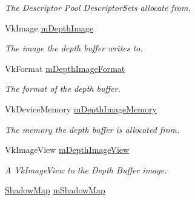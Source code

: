 \begin{DoxyCompactItemize}
\begin{DoxyCompactList}\small\item\em The Descriptor Pool Descriptor\+Sets allocate from. \end{DoxyCompactList}\item 
\mbox{\label{class_render_system_a57ca6a17b446f6aeb649f27b0a075c4c}} 
Vk\+Image \mbox{\hyperlink{class_render_system_a57ca6a17b446f6aeb649f27b0a075c4c}{m\+Depth\+Image}}
\begin{DoxyCompactList}\small\item\em The image the depth buffer writes to. \end{DoxyCompactList}\item 
\mbox{\label{class_render_system_ac15de0abc7ef6ac32a374ced4ca4c640}} 
Vk\+Format \mbox{\hyperlink{class_render_system_ac15de0abc7ef6ac32a374ced4ca4c640}{m\+Depth\+Image\+Format}}
\begin{DoxyCompactList}\small\item\em The format of the depth buffer. \end{DoxyCompactList}\item 
\mbox{\label{class_render_system_adfe7fee3deae55b57e895ab097a4a64b}} 
Vk\+Device\+Memory \mbox{\hyperlink{class_render_system_adfe7fee3deae55b57e895ab097a4a64b}{m\+Depth\+Image\+Memory}}
\begin{DoxyCompactList}\small\item\em The memory the depth buffer is allocated from. \end{DoxyCompactList}\item 
\mbox{\label{class_render_system_a49ef2c844cbe00e4059ea299c709e1e0}} 
Vk\+Image\+View \mbox{\hyperlink{class_render_system_a49ef2c844cbe00e4059ea299c709e1e0}{m\+Depth\+Image\+View}}
\begin{DoxyCompactList}\small\item\em A Vk\+Image\+View to the Depth Buffer image. \end{DoxyCompactList}\item 
\mbox{\label{class_render_system_aad8d71a8ab05c208998a422966ade04a}} 
\mbox{\hyperlink{struct_shadow_map}{Shadow\+Map}} \mbox{\hyperlink{class_render_system_aad8d71a8ab05c208998a422966ade04a}{m\+Shadow\+Map}}

\end{DoxyCompactItemize}
